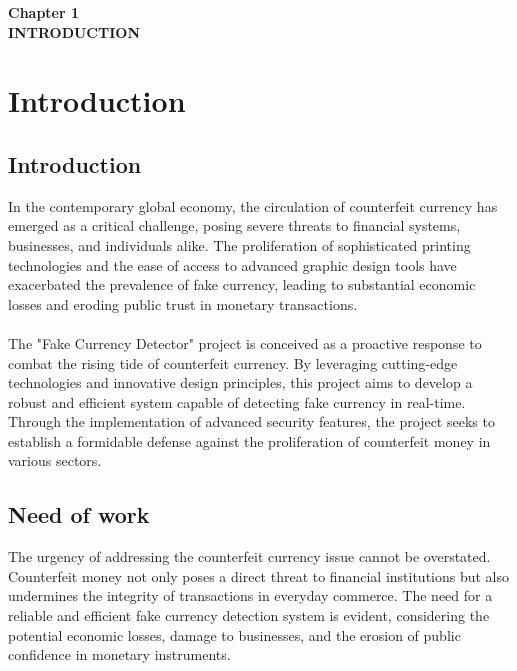 \documentclass[12pt]{article}
\begin{document}
\clearpage




\begin{center}
 \LARGE \textbf {Chapter 1 }\\[10mm]
 \Large \textbf{INTRODUCTION}\\[10mm]
 \end{center}
 \section{Introduction}
\subsection{Introduction}
In the contemporary global economy, the circulation of counterfeit currency has emerged as a critical challenge, posing severe threats to financial systems, businesses, and individuals alike. The proliferation of sophisticated printing technologies and the ease of access to advanced graphic design tools have exacerbated the prevalence of fake currency, leading to substantial economic losses and eroding public trust in monetary transactions.\\[1mm]\\[1mm]
The "Fake Currency Detector" project is conceived as a proactive response to combat the rising tide of counterfeit currency. By leveraging cutting-edge technologies and innovative design principles, this project aims to develop a robust and efficient system capable of detecting fake currency in real-time. Through the implementation of advanced security features, the project seeks to establish a formidable defense against the proliferation of counterfeit money in various sectors.\\[1mm]
 
 \subsection{Need of work}
The urgency of addressing the counterfeit currency issue cannot be overstated. Counterfeit money not only poses a direct threat to financial institutions but also undermines the integrity of transactions in everyday commerce. The need for a reliable and efficient fake currency detection system is evident, considering the potential economic losses, damage to businesses, and the erosion of public confidence in monetary instruments.\\[1mm]
\end{document}
